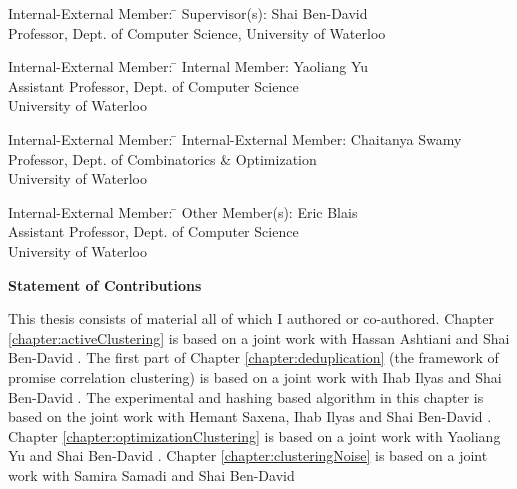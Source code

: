 \documentclass[letterpaper,12pt,titlepage,oneside,final]{book}
\let\origdoublepage\cleardoublepage
\newcommand{\clearemptydoublepage}{%
  \clearpage{\pagestyle{empty}\origdoublepage}}
\let\cleardoublepage\clearemptydoublepage
\begin{document}
  \noindent
\begin{tabbing}
Internal-External Member: \=  \kill %
Supervisor(s): \> Shai Ben-David \\
\> Professor, Dept. of Computer Science, University of Waterloo \\
\end{tabbing}
  \bigskip
  
  \noindent
  \begin{tabbing}
Internal-External Member: \=  \kill %
Internal Member: \> Yaoliang Yu \\
\> Assistant Professor, Dept. of Computer Science\\
\> University of Waterloo \\
\end{tabbing}
  \bigskip
  
  \noindent
\begin{tabbing}
Internal-External Member: \=  \kill %
Internal-External Member: \> Chaitanya Swamy \\
\> Professor, Dept. of Combinatorics \& Optimization\\ \>University of Waterloo \\
\end{tabbing}
  \bigskip
  
  \noindent
\begin{tabbing}
Internal-External Member: \=  \kill %
Other Member(s): \> Eric Blais \\
\> Assistant Professor, Dept. of Computer Science\\
\> University of Waterloo \\
\end{tabbing}

\cleardoublepage

\begin{center}\textbf{Statement of Contributions}\end{center}
  \noindent
This thesis consists of material all of which I authored or co-authored. Chapter \ref{chapter:activeClustering} is based on a joint work with Hassan Ashtiani and Shai Ben-David \cite{ashtiani2016clustering}. The first part of Chapter \ref{chapter:deduplication} (the framework of promise correlation clustering) is based on a joint work with Ihab Ilyas and Shai Ben-David \cite{kushagra2019semisupervised}. The experimental and hashing based algorithm in this chapter is based on the joint work with Hemant Saxena, Ihab Ilyas and Shai Ben-David \cite{kushagra2019asemisupervised}. Chapter \ref{chapter:optimizationClustering} is based on a joint work with Yaoliang Yu and Shai Ben-David \cite{kushagra2017provably}. Chapter \ref{chapter:clusteringNoise} is based on a joint work with Samira Samadi and Shai Ben-David \cite{kushagra2016finding}
\end{document}

